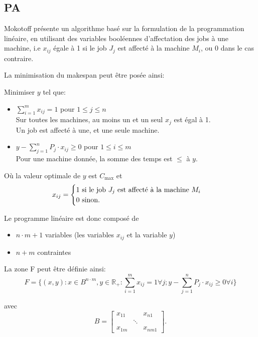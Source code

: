 \documentclass[a4paper,12pt]{report}
\theoremstyle{plain}				%
\theoremstyle{definition}				%
\newcommand{\tdi}[1]{\todo[inline]{{#1}}{}}
\newcommand{\lp}[1]{\todo[author=LP,color=yellow,inline]{#1}}
\begin{document}
\subsection{PA} %

Mokotoff \cite{mokoto1999scheduling} présente un algorithme basé sur
la formulation de la programmation linéaire, en utilisant des
variables booléennes d'affectation des jobs à une machine, i.e $x_{ij}$ égale à 1 si le job $J_j$ est affecté à la machine $M_i$, ou 0 dans le cas contraire.

\bigskip
La minimisation du makespan peut être posée ainsi:

Minimiser $y$ tel que:

\begin{itemize}
\item $\sum_{i=1}^{m}x_{ij}=1$ \quad pour $1 \leq j \leq n$ 		\\
Sur toutes les machines, au moins un et un seul $x_j$ est égal à 1.	\\
Un job est affecté à une, et une seule machine.

\item $y-\sum_{j=1}^{n}P_j \cdot x_{ij} \geq 0$ \quad pour $1 \leq i \leq m$ \\
Pour une machine donnée, la somme des temps est $\leq$ à $y$.
\end{itemize}

\bigskip
Où la valeur optimale de $y$ est $C_{\max}$
et
\[
  x_{ij} =
  \begin{cases}
    1 \textnormal{ si le job $J_j$ est affecté à la machine $M_i$}\\
    0 \textnormal{ sinon.}\\
  \end{cases}
\]

Le programme linéaire est donc composé de
\begin{itemize}
\item $n \cdot m + 1$ variables (les variables $x_{ij}$ et la variable $y$)
\item $n+m$ contraintes
\end{itemize}

La zone F peut être définie ainsi:
\[
  F=\{ (x,y) : x \in B^{n \cdot m}, y \in \mathbb{R_+} : \sum_{i=1}^{m} x_{ij}=1 \forall j;
y-\sum_{j=1}^{n} P_j \cdot x_{ij} \geq 0 \forall i \}
\]

avec
\[
B=\begin{bmatrix}
x_{11}& &x_{n1}\\
& \ddots & \\
x_{1m}& &x_{nm1}
\end{bmatrix}.
\]
\end{document}
